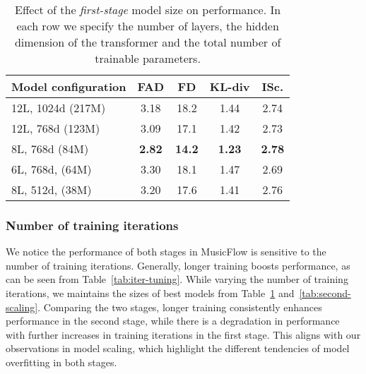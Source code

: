 \begin{table}[htp]
\caption{Effect of the \emph{first-stage} model size  on performance. In each row we specify the number of layers, the hidden dimension of the transformer and the total number of trainable parameters.}
\label{tab:first-scaling}
\begin{center}
\begin{small}
\begin{sc}
\begin{tabular}{lcccc}
\toprule
Model configuration & FAD & FD & KL-div & ISc. \\
\midrule
12L, 1024d (217M) & 3.18 & 18.2 & 1.44  & 2.74 \\
12L, 768d (123M) & 3.09 & 17.1 & 1.42 & 2.73 \\
8L, 768d (84M) & \textbf{2.82} & \textbf{14.2} & \textbf{1.23}& \textbf{2.78} \\
6L, 768d, (64M) & 3.30 & 18.1 & 1.47  & 2.69  \\
8L, 512d, (38M) & 3.20 & 17.6 & 1.41 & 2.76 \\
\bottomrule
\end{tabular}
\end{sc}
\end{small}
\end{center}
\end{table}

\subsubsection{Number of training iterations} 
We notice the performance of both stages in MusicFlow is sensitive to the number of training iterations. Generally, longer training boosts performance, as can be seen from Table~\ref{tab:iter-tuning}. While varying the number of training iterations, we maintains the sizes of best models from Table~\ref{tab:first-scaling} and~\ref{tab:second-scaling}. Comparing the two stages, longer training consistently enhances performance in the second stage, while there is a degradation in performance with further increases in training iterations in the first stage. 
This aligns with our observations in model scaling, which highlight the different tendencies of model overfitting in both stages.

